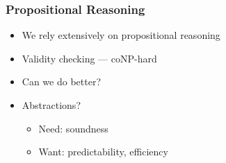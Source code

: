 \documentclass[
    aspectratio=169,
    xcolor={dvipsnames},
]{beamer}
\begin{document}
\begin{frame}
    \frametitle{Propositional Reasoning}


    \begin{itemize}[<+->]
        \item We rely extensively on propositional reasoning
        \item Validity checking --- coNP-hard
        \item Can we do better? 
        \item Abstractions?
        \begin{itemize}
            \item Need: soundness
            \item Want: predictability, efficiency 
        \end{itemize}
    \end{itemize}



\end{frame}
\end{document}
